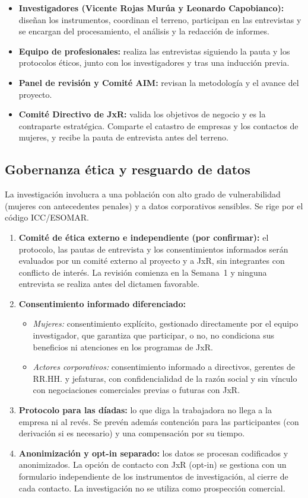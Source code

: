 \begin{itemize}
    \item \textbf{Investigadores (Vicente Rojas Murúa y Leonardo Capobianco):} diseñan los instrumentos, coordinan el terreno, participan en las entrevistas y se encargan del procesamiento, el análisis y la redacción de informes.
    \item \textbf{Equipo de profesionales:} realiza las entrevistas siguiendo la pauta y los protocolos éticos, junto con los investigadores y tras una inducción previa.
    \item \textbf{Panel de revisión y Comité AIM:} revisan la metodología y el avance del proyecto.
    \item \textbf{Comité Directivo de JxR:} valida los objetivos de negocio y es la contraparte estratégica. Comparte el catastro de empresas y los contactos de mujeres, y recibe la pauta de entrevista antes del terreno.
\end{itemize}

\subsection{Gobernanza ética y resguardo de datos}

La investigación involucra a una población con alto grado de vulnerabilidad (mujeres con antecedentes penales) y a datos corporativos sensibles. Se rige por el código ICC/ESOMAR.

\begin{enumerate}
    \item \textbf{Comité de ética externo e independiente (por confirmar):} el protocolo, las pautas de entrevista y los consentimientos informados serán evaluados por un comité externo al proyecto y a JxR, sin integrantes con conflicto de interés. La revisión comienza en la Semana~1 y ninguna entrevista se realiza antes del dictamen favorable.
    \item \textbf{Consentimiento informado diferenciado:}
    \begin{itemize}
        \item \textit{Mujeres:} consentimiento explícito, gestionado directamente por el equipo investigador, que garantiza que participar, o no, no condiciona sus beneficios ni atenciones en los programas de JxR.
        \item \textit{Actores corporativos:} consentimiento informado a directivos, gerentes de RR.HH. y jefaturas, con confidencialidad de la razón social y sin vínculo con negociaciones comerciales previas o futuras con JxR.
    \end{itemize}
    \item \textbf{Protocolo para las díadas:} lo que diga la trabajadora no llega a la empresa ni al revés. Se prevén además contención para las participantes (con derivación si es necesario) y una compensación por su tiempo.
    \item \textbf{Anonimización y opt-in separado:} los datos se procesan codificados y anonimizados. La opción de contacto con JxR (opt-in) se gestiona con un formulario independiente de los instrumentos de investigación, al cierre de cada contacto. La investigación no se utiliza como prospección comercial.
\end{enumerate}

